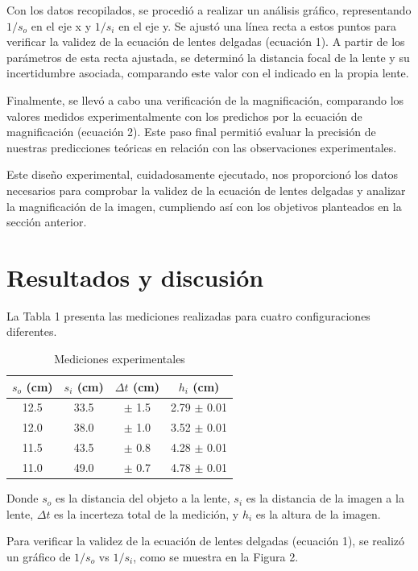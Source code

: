 \documentclass[twocolumn,a4paper,11pt]{scrartcl}
\begin{document}
Con los datos recopilados, se procedió a realizar un análisis gráfico, representando $1/s_o$ en el eje x y $1/s_i$ en el eje y. Se ajustó una línea recta a estos puntos para verificar la validez de la ecuación de lentes delgadas (ecuación 1). A partir de los parámetros de esta recta ajustada, se determinó la distancia focal de la lente y su incertidumbre asociada, comparando este valor con el indicado en la propia lente.

Finalmente, se llevó a cabo una verificación de la magnificación, comparando los valores medidos experimentalmente con los predichos por la ecuación de magnificación (ecuación 2). Este paso final permitió evaluar la precisión de nuestras predicciones teóricas en relación con las observaciones experimentales.

Este diseño experimental, cuidadosamente ejecutado, nos proporcionó los datos necesarios para comprobar la validez de la ecuación de lentes delgadas y analizar la magnificación de la imagen, cumpliendo así con los objetivos planteados en la sección anterior.

\section{Resultados y discusión}

La Tabla 1 presenta las mediciones realizadas para cuatro configuraciones diferentes.

\begin{table}[h]
\centering
\caption{Mediciones experimentales}
\label{tab:mediciones}
\begin{tabular}{|c|c|c|c|}
\hline
$s_o$ (cm) & $s_i$ (cm) & $\Delta t$ (cm) & $h_i$ (cm) \\
\hline
12.5 & 33.5 & $\pm$ 1.5 & 2.79 $\pm$ 0.01 \\
12.0 & 38.0 & $\pm$ 1.0 & 3.52 $\pm$ 0.01 \\
11.5 & 43.5 & $\pm$ 0.8 & 4.28 $\pm$ 0.01 \\
11.0 & 49.0 & $\pm$ 0.7 & 4.78 $\pm$ 0.01 \\
\hline
\end{tabular}
\end{table}

Donde $s_o$ es la distancia del objeto a la lente, $s_i$ es la distancia de la imagen a la lente, $\Delta t$ es la incerteza total de la medición, y $h_i$ es la altura de la imagen.

Para verificar la validez de la ecuación de lentes delgadas (ecuación 1), se realizó un gráfico de $1/s_o$ vs $1/s_i$, como se muestra en la Figura 2.
\end{document}
